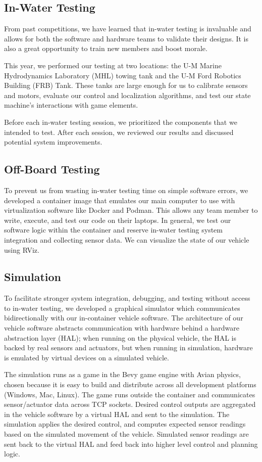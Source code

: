 \documentclass[conference]{IEEEtran}
\begin{document}
\subsection{In-Water Testing}
\label{ssec:in_water_testing}
From past competitions, we have learned that in-water testing is invaluable and allows for both the software and hardware teams to validate their designs. It is also a great opportunity to train new members and boost morale.

This year, we performed our testing at two locations: the U-M Marine Hydrodynamics Laboratory (MHL) towing tank and the U-M Ford Robotics Building (FRB) Tank. These tanks are large enough for us to calibrate sensors and motors, evaluate our control and localization algorithms, and test our state machine's interactions with game elements.

Before each in-water testing session, we prioritized the components that we intended to test. After each session, we reviewed our results and discussed potential system improvements.

\subsection{Off-Board Testing}
\label{ssec:off_board_testing}
To prevent us from wasting in-water testing time on simple software errors, we developed a container image that emulates our main computer to use with virtualization software like Docker and Podman. This allows any team member to write, execute, and test our code on their laptops. In general, we test our software logic within the container and reserve in-water testing system integration and collecting sensor data. We can visualize the state of our vehicle using RViz.

\subsection{Simulation}
\label{ssec:simulation}
To facilitate stronger system integration, debugging, and testing without access to in-water testing, we developed a graphical simulator which communicates bidirectionally with our in-container vehicle software. The architecture of our vehicle software abstracts communication with hardware behind a hardware abstraction layer (HAL); when running on the physical vehicle, the HAL is backed by real sensors and actuators, but when running in simulation, hardware is emulated by virtual devices on a simulated vehicle.

The simulation runs as a game in the Bevy game engine \cite{b10} with Avian physics, chosen because it is easy to build and distribute across all development platforms (Windows, Mac, Linux). The game runs outside the container and communicates sensor/actuator data across TCP sockets. Desired control outputs are aggregated in the vehicle software by a virtual HAL and sent to the simulation. The simulation applies the desired control, and computes expected sensor readings based on the simulated movement of the vehicle. Simulated sensor readings are sent back to the virtual HAL and feed back into higher level control and planning logic.
\end{document}
